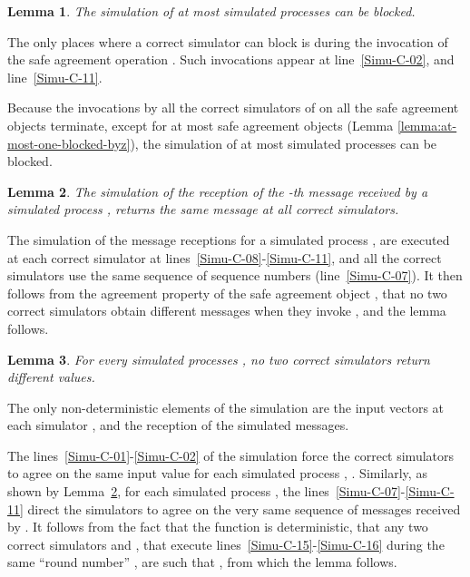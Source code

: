 \documentclass[11pt,letterpaper]{article}
\newtheorem{lemma}{Lemma}
\newlength {\afterproof}
\newcommand{\toto}{xxx}
\newenvironment{proofL}{\noindent{\bf Proof }}
{\hspace*{\fill}\par\vspace{\afterproof}}
\begin{document}
\begin{lemma}
\label{lemma:at-most-one-crash-byz}
The simulation of at most  simulated processes can be blocked.
\end{lemma}

\begin{proofL}
The only places where a correct simulator  can block is 
during the invocation of
the safe agreement operation . Such invocations appear at
line~\ref{Simu-C-02}, and line~\ref{Simu-C-11}. 


Because the invocations by all the correct simulators  of 
on all the safe agreement objects terminate, except for at most 
safe agreement objects (Lemma \ref{lemma:at-most-one-blocked-byz}),
the simulation of at most  simulated processes can be blocked.
\renewcommand{\toto}{lemma:at-most-one-crash-byz}
\end{proofL}

\begin{lemma}
\label{lemma:same-seq-of-messages-byz}
The simulation of the reception of the -th
message received by a simulated process , returns the same message
at all correct simulators.
\end{lemma}

\begin{proofL}
The simulation of the message receptions for a simulated process ,
are executed at each correct simulator  at lines~\ref{Simu-C-08}-\ref{Simu-C-11},
and all the correct simulators use the same sequence of sequence numbers
(line~\ref{Simu-C-07}).
It then follows from the agreement property of the safe agreement object
, that no two correct simulators obtain different messages
when they invoke  , and the lemma follows.
\renewcommand{\toto}{lemma:same-seq-of-messages-byz}
\end{proofL}

\begin{lemma}
\label{lemma:one-dec-value-byz}
For every simulated processes , no two correct simulators return
different values.
\end{lemma}

\begin{proofL}
The only non-deterministic elements of the simulation are the input vectors
 at each simulator , and the reception of the simulated
messages.

The lines~\ref{Simu-C-01}-\ref{Simu-C-02} of the
simulation force  the correct simulators to agree on the same input value
for each simulated process , .
Similarly,  as shown by Lemma~\ref{lemma:same-seq-of-messages-byz},
for each simulated process , the lines~\ref{Simu-C-07}-\ref{Simu-C-11}
direct the simulators to  agree on the very same sequence of messages
received by . It follows from the fact that the function 
is deterministic, that   any two correct simulators  and ,
that execute  lines~\ref{Simu-C-15}-\ref{Simu-C-16} during the
same ``round number'' , are such that ,
from which the lemma follows.
\renewcommand{\toto}{lemma:one-dec-value-byz}
\end{proofL}
\end{document}
